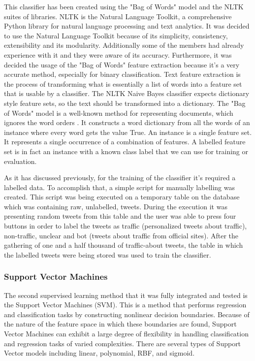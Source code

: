 This classifier has been created using the "Bag of Words" model and the NLTK suites of libraries. NLTK is the Natural Language Toolkit, a comprehensive Python library for natural language processing and text analytics. It was decided to use the Natural Language Toolkit because of its simplicity, consistency, extensibility and its modularity. Additionally some of the members had already experience with it and they were aware of its accuracy. Furthermore, it was decided the usage of the "Bag of Words" feature extraction because it's a very accurate method, especially for binary classification. Text feature extraction is the process of transforming what is essentially a list of words into a feature set that is usable by a classifier. The NLTK Naive Bayes classifier expects dictionary style feature sets, so the text should be transformed into a dictionary. The "Bag of Words" model is a well-known method for representing documents, which ignores the word orders \cite{Bird}\cite{Perkins}. It constructs a word dictionary from all the words of an instance where every word gets the value True. An instance is a single feature set. It represents a single occurrence of a combination of features. A labelled feature set is in fact an instance with a known class label that we can use for training or evaluation.

As it has discussed previously, for the training of the classifier it's required a labelled data. To accomplish that, a simple script for manually labelling was created. This script was being executed on a temporary table on the database which was containing raw, unlabelled, tweets. During the execution it was presenting random tweets from this table and the user was able to press four buttons in order to label the tweets as traffic (personalized tweets about traffic), non-traffic, unclear and bot (tweets about traffic from official sites). After the gathering of one and a half thousand of traffic-about tweets, the table in which the labelled tweets were being stored was used to train the classifier.

\subsubsection{Support Vector Machines}
The second supervised learning method that it was fully integrated and tested is the Support Vector Machines (SVM). This is a method that performs regression and classification tasks by constructing nonlinear decision boundaries. Because of the nature of the feature space in which these boundaries are found, Support Vector Machines can exhibit a large degree of flexibility in handling classification and regression tasks of varied complexities. There are several types of Support Vector models including linear, polynomial, RBF, and sigmoid.

